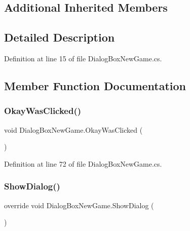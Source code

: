 \subsection*{Additional Inherited Members}


\subsection{Detailed Description}


Definition at line 15 of file Dialog\+Box\+New\+Game.\+cs.



\subsection{Member Function Documentation}
\mbox{\label{class_dialog_box_new_game_a75aa94cf4f95e81cd48073130e920748}} 
\subsubsection{\texorpdfstring{Okay\+Was\+Clicked()}{OkayWasClicked()}}
{\footnotesize\ttfamily void Dialog\+Box\+New\+Game.\+Okay\+Was\+Clicked (\begin{DoxyParamCaption}{ }\end{DoxyParamCaption})}



Definition at line 72 of file Dialog\+Box\+New\+Game.\+cs.

\mbox{\label{class_dialog_box_new_game_a80ad43c7b72fad35a600511e95578eea}} 
\subsubsection{\texorpdfstring{Show\+Dialog()}{ShowDialog()}}
{\footnotesize\ttfamily override void Dialog\+Box\+New\+Game.\+Show\+Dialog (\begin{DoxyParamCaption}{ }\end{DoxyParamCaption})\hspace{0.3cm}{\ttfamily [virtual]}}



